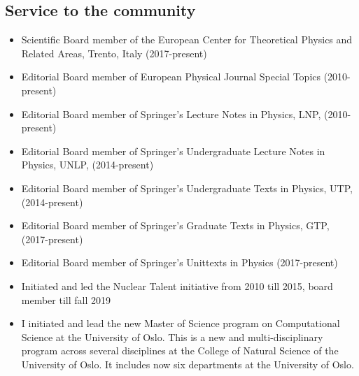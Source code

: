 \documentclass[prc,amsart,english,superscriptaddress,showpacs,floatfix]{revtex4}
\begin{document}
  \subsection*{Service to the community}
\begin{itemize}

\item Scientific Board member of the European Center for Theoretical Physics and Related Areas, Trento, Italy (2017-present)
  
\item Editorial Board member of European Physical Journal Special Topics (2010-present)

\item Editorial Board member of Springer's Lecture Notes  in Physics, LNP,  (2010-present)

\item Editorial Board member of Springer's Undergraduate Lecture Notes in Physics, UNLP, (2014-present)

\item Editorial Board member of Springer's Undergraduate Texts in Physics, UTP,  (2014-present)

\item Editorial Board member of Springer's Graduate Texts in Physics, GTP,  (2017-present)

\item Editorial Board member of Springer's Unittexts in Physics (2017-present)


\item {Initiated and led the Nuclear Talent initiative from 2010 till 2015, board member till fall 2019}

\item I initiated and lead the new {Master of Science program on Computational Science at the University of Oslo}. This is a new and multi-disciplinary program across several disciplines at the College of Natural Science of the University of Oslo. It includes now six departments at the University of Oslo.
\end{itemize}
\end{document}
